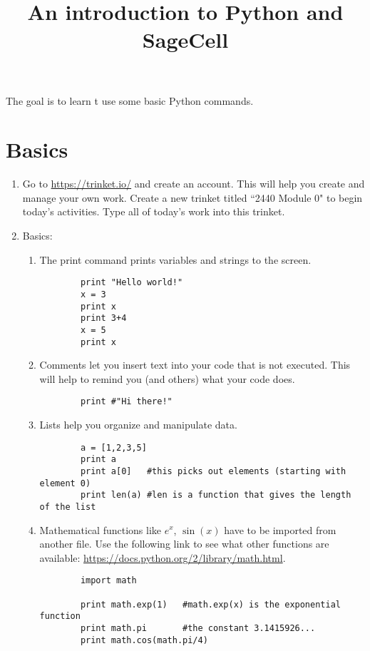 \documentclass{ximera}
\title{An introduction to Python and SageCell}
\begin{document}
The goal is to learn t use some basic Python commands.
\begin{abstract}  
\end{abstract}  
\maketitle

\section{Basics}

\begin{enumerate}
\item Go to \url{https://trinket.io/} and create an account. This will help you create and manage your own work. Create a new trinket titled ``2440 Module 0" to begin today's activities. Type all of today's work into this trinket.
\item Basics:
    \begin{enumerate}
        \item The print command prints variables and strings to the screen.
        \begin{verbatim}
        print "Hello world!"
        x = 3
        print x
        print 3+4
        x = 5
        print x
        \end{verbatim}
        \item Comments let you insert text into your code that is not executed. This will help to remind you (and others) what your code does.
        \begin{verbatim}
        print #"Hi there!"
        \end{verbatim}
        \item Lists help you organize and manipulate data.
        \begin{verbatim}
        a = [1,2,3,5]
        print a
        print a[0]   #this picks out elements (starting with element 0)
        print len(a) #len is a function that gives the length of the list
        \end{verbatim}
        \item Mathematical functions like $e^x$, $\sin(x)$ have to be imported from another file. Use the following link to see what other functions are available: \url{https://docs.python.org/2/library/math.html}.
        \begin{verbatim}
        import math

        print math.exp(1)   #math.exp(x) is the exponential function
        print math.pi       #the constant 3.1415926...
        print math.cos(math.pi/4)
        \end{verbatim}


\end{enumerate}
\end{enumerate}
\end{document}
